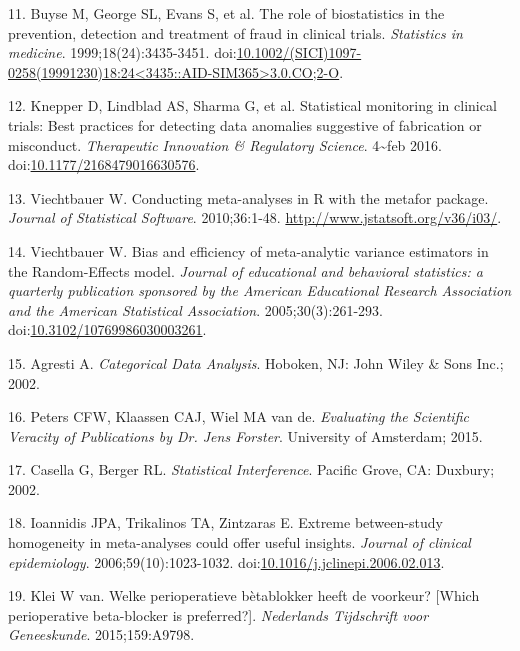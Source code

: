\documentclass[]{article}
\begin{document}
\hypertarget{ref-Buyse1999-jq}{}
11. Buyse M, George SL, Evans S, et al. The role of biostatistics in the
prevention, detection and treatment of fraud in clinical trials.
\emph{Statistics in medicine}. 1999;18(24):3435-3451.
doi:\href{https://doi.org/10.1002/(SICI)1097-0258(19991230)18:24\%3C3435::AID-SIM365\%3E3.0.CO;2-O}{10.1002/(SICI)1097-0258(19991230)18:24\textless{}3435::AID-SIM365\textgreater{}3.0.CO;2-O}.

\hypertarget{ref-Knepper2016-la}{}
12. Knepper D, Lindblad AS, Sharma G, et al. Statistical monitoring in
clinical trials: Best practices for detecting data anomalies suggestive
of fabrication or misconduct. \emph{Therapeutic Innovation \& Regulatory
Science}. 4\textasciitilde{}feb 2016.
doi:\href{https://doi.org/10.1177/2168479016630576}{10.1177/2168479016630576}.

\hypertarget{ref-viechtbauer2010}{}
13. Viechtbauer W. Conducting meta-analyses in R with the metafor
package. \emph{Journal of Statistical Software}. 2010;36:1-48.
\url{http://www.jstatsoft.org/v36/i03/}.

\hypertarget{ref-viechtbauer2005}{}
14. Viechtbauer W. Bias and efficiency of meta-analytic variance
estimators in the Random-Effects model. \emph{Journal of educational and
behavioral statistics: a quarterly publication sponsored by the American
Educational Research Association and the American Statistical
Association}. 2005;30(3):261-293.
doi:\href{https://doi.org/10.3102/10769986030003261}{10.3102/10769986030003261}.

\hypertarget{ref-agresti2002}{}
15. Agresti A. \emph{Categorical Data Analysis}. Hoboken, NJ: John Wiley
\& Sons Inc.; 2002.

\hypertarget{ref-peters2015}{}
16. Peters CFW, Klaassen CAJ, Wiel MA van de. \emph{Evaluating the
Scientific Veracity of Publications by Dr. Jens Forster}. University of
Amsterdam; 2015.

\hypertarget{ref-casella2002}{}
17. Casella G, Berger RL. \emph{Statistical Interference}. Pacific
Grove, CA: Duxbury; 2002.

\hypertarget{ref-ioannidis2006}{}
18. Ioannidis JPA, Trikalinos TA, Zintzaras E. Extreme between-study
homogeneity in meta-analyses could offer useful insights. \emph{Journal
of clinical epidemiology}. 2006;59(10):1023-1032.
doi:\href{https://doi.org/10.1016/j.jclinepi.2006.02.013}{10.1016/j.jclinepi.2006.02.013}.

\hypertarget{ref-klei2015}{}
19. Klei W van. Welke perioperatieve bètablokker heeft de voorkeur?
{[}Which perioperative beta-blocker is preferred?{]}. \emph{Nederlands
Tijdschrift voor Geneeskunde}. 2015;159:A9798.
\end{document}
